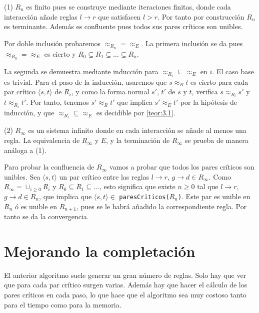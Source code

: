 \begin{demo}
  (1) $R_n$ es finito pues se construye mediante iteraciones finitas,
  donde cada interacción añade reglas $l \rightarrow r$ que satisfacen
  $l > r$. Por tanto por construcción $R_n$ es terminante. Además es
  confluente pues todos sus pares críticos son unibles.

  Por doble inclusión probaremos $\approx_{R_n} = \approx_E$.  La
  primera inclusión se da pues $\approx_{R_0} = \approx_E$ es cierto y
  $R_0 \subseteq R_1 \subseteq \dots \subseteq R_n$.

  La segunda se demuestra mediante inducción para
  $\approx_{R_i} \subseteq \approx_E$ en $i$.  El caso base es
  trivial. Para el paso de la inducción, usaremos que $s \approx_R t$
  es cierto para cada par crítico $\langle s, t \rangle$ de $R_i$, y
  como la forma normal $s'$, $t'$ de $s$ y $t$, verifica
  $s \approx_{R_i} s'$ y $t \approx_{R_i} t'$. Por tanto, tenemos
  $s' \approx_R t'$ que implica $s' \approx_E t'$ por la hipótesis de
  inducción, y que $ \approx_{R_i} \subseteq \approx_E$ es decidible
  por \ref{teor:3.1}.

  (2) $R_{\infty }$ es un sistema infinito donde en cada interacción
  se añade al menos una regla. La equivalencia de $R_{\infty }$ y $E$,
  y la terminación de $R_{\infty }$ se prueba de manera análoga a (1).

  Para probar la confluencia de $R_{\infty }$ vamos a probar que todos
  los pares críticos son unibles. Sea $\langle s,t \rangle$ un par
  crítico entre las reglas $l \rightarrow r$,
  $g \rightarrow d \in R_{\infty }$. Como
  $R_{\infty } = \cup_{i \geq 0} R_i$ y
  $R_0 \subseteq R_1 \subseteq \dots$, esto significa que existe
  $n \geq 0$ tal que $l \rightarrow r$, $g \rightarrow d \in R_n$, que
  implica que $\langle s,t \rangle \in$
  \texttt{paresCriticos($R_n$)}. Este par es unible en $R_n$ ó es
  unible en $R_{n+1}$, pues se le habrá añadido la correspondiente
  regla. Por tanto se da la convergencia.
\end{demo}

\section{Mejorando la completación}

El anterior algoritmo suele generar un gran número de reglas. Solo hay
que ver que para cada par crítico surgen varias. Además hay que hacer
el cálculo de los pares críticos en cada paso, lo que hace que el
algoritmo sea muy costoso tanto para el tiempo como para la memoria.

